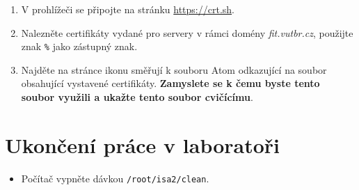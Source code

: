 \documentclass[a4paper,11pt]{article}
\begin{document}
\begin{enumerate}
\begin{enumerate}
      \item V prohlížeči se připojte na stránku \url{https://crt.sh}.

      \item Nalezněte certifikáty vydané pro servery v rámci domény
        \emph{fit.vutbr.cz}, použijte znak \verb|%| jako zástupný znak.

      \item Najděte na stránce ikonu směřují k souboru Atom odkazující na soubor
        obsahující vystavené certifikáty. {\bf Zamyslete se k čemu byste tento soubor
        využili a ukažte tento soubor cvičícímu}.

    \end{enumerate}

\end{enumerate}


\section{Ukončení práce v laboratoři}
\begin{itemize}
  \item Počítač vypněte dávkou {\tt /root/isa2/clean}.
\end{itemize}
\end{document}
